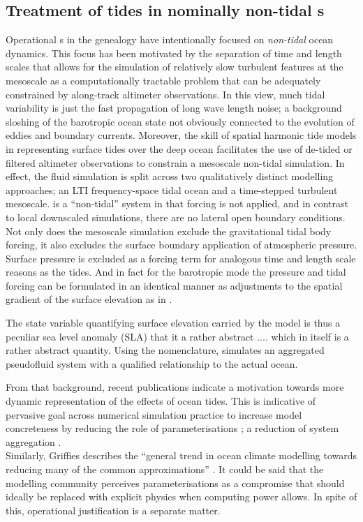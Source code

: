 \subsection{Treatment of tides in nominally non-tidal \OGCM{}s}
\label{sec:tides_ogcm}
Operational \OGCM{}s in the \GODAE{} genealogy have intentionally focused on \emph{non-tidal} ocean dynamics. This focus has been motivated by the separation of time and length scales that allows for the simulation of relatively slow turbulent features at the mesoscale as a computationally tractable problem that can be adequately constrained by along-track altimeter observations.
In this view, much tidal variability is just the fast propagation of long wave length noise; a background sloshing of the barotropic ocean state not obviously connected to the evolution of eddies and boundary currents.
Moreover, the skill of spatial harmonic tide models in representing surface tides over the deep ocean facilitates the use of de-tided or filtered altimeter observations to constrain a mesoscale non-tidal simulation. In effect, the fluid simulation is split across two qualitatively distinct modelling approaches; an LTI frequency-space tidal ocean and a time-stepped turbulent mesoscale.  
\BL{} is a ``non-tidal'' system in that \ATGP{} forcing is not applied, and in contrast to local downscaled simulations, there are no lateral open boundary conditions. Not only does the mesoscale simulation exclude the gravitational tidal body forcing, it also excludes the surface boundary application of atmospheric pressure.   
Surface pressure is excluded as a forcing term for analogous time and length scale reasons as the tides.  And in fact for the barotropic mode the pressure and tidal forcing can be formulated in an identical manner as adjustments to the spatial gradient of the surface elevation as in \citet[Eq9.9.5]{gill1982atmosphere}.

The state variable quantifying surface elevation carried by the model is thus a peculiar sea level anomaly (SLA) that it a rather abstract  ....
which in itself is a rather abstract quantity. 
Using the \citet{Stevens:2001kb} nomenclature, \BL{} simulates an aggregated pseudofluid system with a qualified relationship to the actual ocean.



From that background, recent publications indicate a motivation towards more dynamic representation of the effects of ocean tides.   This is indicative of pervasive goal across numerical simulation practice to increase model concreteness by reducing the role of parameterisations \cite[section 5.3]{Petersen:2012tr}; a reduction of system aggregation \citep{Stevens:2001kb}.\\
Similarly, Griffies describes the ``general trend in ocean climate modelling towards reducing many of the common approximations'' \citep[pp20] {Griffies:2004vs}.
It could be said that the modelling community perceives parameterisations as a compromise that should ideally be replaced with explicit physics when computing power allows.  In spite of this, operational justification is a separate matter.

